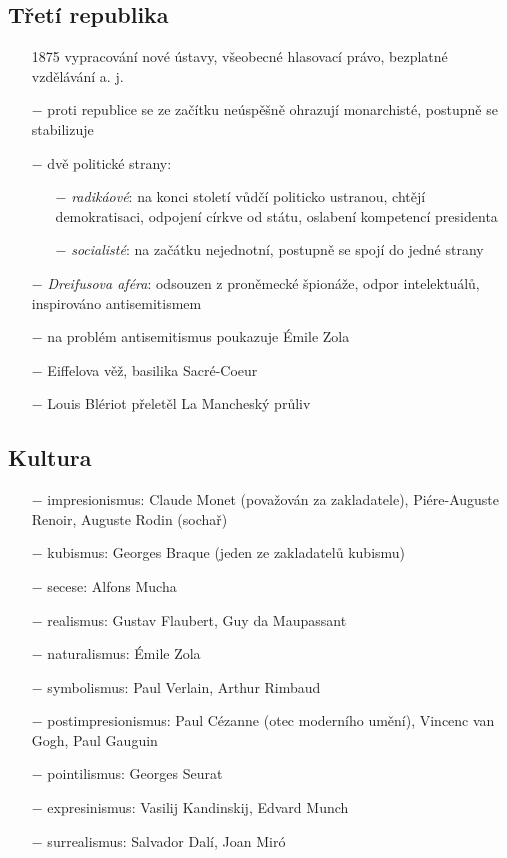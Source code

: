 \documentclass{article}
\begin{document}
\subsection*{Třetí republika}
\begin{itemize}
    \vspace{-0.5em}
    \setlength\itemsep{0.15em}
    \item[1875] vypracování nové ústavy, všeobecné hlasovací právo, bezplatné vzdělávání a. j.
    \item[$-$] proti republice se ze začítku neúspěšně ohrazují monarchisté, postupně se stabilizuje
    \item[$-$] dvě politické strany:
    \begin{itemize}
        \vspace{-0.5em}
        \setlength\itemsep{0.15em}
        \item[$-$] \textit{radikáové}: na konci století vůdčí politicko ustranou, chtějí demokratisaci, odpojení církve od státu, oslabení kompetencí presidenta
        \item[$-$] \textit{socialisté}: na začátku nejednotní, postupně se spojí do jedné strany
    \end{itemize}
    \item[$-$] \textit{Dreifusova aféra}: odsouzen z proněmecké špionáže, odpor intelektuálů, inspirováno antisemitismem
    \item[$-$] na problém antisemitismus poukazuje Émile Zola
    \item[$-$] Eiffelova věž, basilika Sacré-Coeur
    \item[$-$] Louis Blériot přeletěl La Mancheský průliv
\end{itemize}

\subsection*{Kultura}
\begin{itemize}
    \vspace{-0.5em}
    \setlength\itemsep{0.15em}
    \item[$-$] impresionismus: Claude Monet (považován za zakladatele), Piére-Auguste Renoir, Auguste Rodin (sochař)
    \item[$-$] kubismus: Georges Braque (jeden ze zakladatelů kubismu)
    \item[$-$] secese: Alfons Mucha
    \item[$-$] realismus: Gustav Flaubert, Guy da Maupassant
    \item[$-$] naturalismus: Émile Zola
    \item[$-$] symbolismus: Paul Verlain, Arthur Rimbaud
    \item[$-$] postimpresionismus: Paul Cézanne (otec moderního umění), Vincenc van Gogh, Paul Gauguin
    \item[$-$] pointilismus: Georges Seurat
    \item[$-$] expresinismus: Vasilij Kandinskij, Edvard Munch
    \item[$-$] surrealismus: Salvador Dalí, Joan Miró
\end{itemize}
\end{document}
